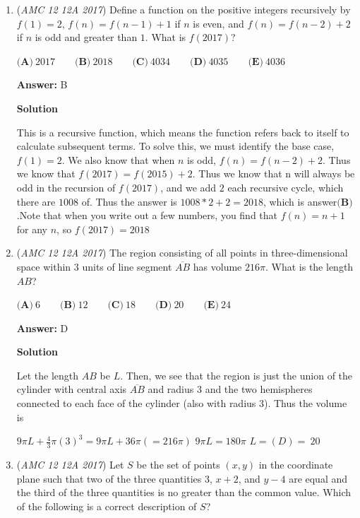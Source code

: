 \begin{enumerate}
	\item (\textit{AMC 12 12A 2017}) Define a function on the positive integers recursively by $f(1) = 2$, $f(n) = f(n-1) + 1$ if $n$ is even, and $f(n) = f(n-2) + 2$ if $n$ is odd and greater than $1$. What is $f(2017)$?


 $\textbf{(A)}\ 2017 \qquad\textbf{(B)}\ 2018 \qquad\textbf{(C)}\ 4034 \qquad\textbf{(D)}\ 4035 \qquad\textbf{(E)}\ 4036$

 \textbf{Answer: }B



\textbf{Solution}

This is a recursive function, which means the function refers back to itself to calculate subsequent terms. To solve this, we must identify the base case, $f(1)=2$. We also know that when $n$ is odd, $f(n)=f(n-2)+2$. Thus we know that $f(2017)=f(2015)+2$. Thus we know that n will always be odd in the recursion of $f(2017)$, and we add $2$ each recursive cycle, which there are $1008$ of. Thus the answer is $1008*2+2=2018$, which is answer$\boxed{\textbf{(B)}}$.Note that when you write out a few numbers, you find that $f(n)=n+1$ for any $n$, so $f(2017)=2018$



	\item (\textit{AMC 12 12A 2017}) The region consisting of all points in three-dimensional space within $3$ units of line segment $\overline{AB}$ has volume $216 \pi$. What is the length $AB$?


 $\textbf{(A)}\ 6 \qquad\textbf{(B)}\ 12 \qquad\textbf{(C)}\ 18 \qquad\textbf{(D)}\ 20 \qquad\textbf{(E)}\ 24$

 \textbf{Answer: }D



\textbf{Solution}

Let the length $AB$ be $L$. Then, we see that the region is just the union of the cylinder with central axis $\overline{AB}$ and radius $3$ and the two hemispheres connected to each face of the cylinder (also with radius $3$). Thus the volume is

 $9\pi L + \frac{4}{3}\pi(3)^3 = 9\pi L + 36\pi ( = 216\pi)$
$9\pi L = 180\pi$
$L = \boxed{(D)=\ 20}$



	\item (\textit{AMC 12 12A 2017}) Let $S$ be the set of points $(x,y)$ in the coordinate plane such that two of the three quantities $3$, $x+2$, and $y-4$ are equal and the third of the three quantities is no greater than the common value. Which of the following is a correct description of $S$?



\end{enumerate}
